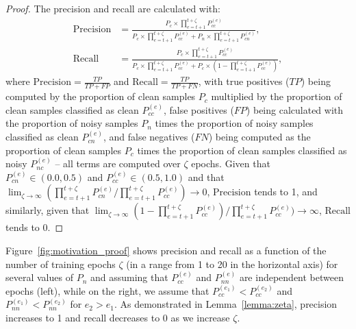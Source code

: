 \documentclass[review]{elsarticle}
\begin{document}
\begin{proof}

The precision and recall are calculated with:
\begin{equation}
\begin{split}
    \text{Precision}&=\frac{P_c \times  \prod_{e=t+1}^{t+\zeta} P^{(e)}_{cc}}{ P_c \times \prod_{e=t+1}^{t+\zeta} P^{(e)}_{cc} +  P_n \times \prod_{e=t+1}^{t+\zeta} P^{(e)}_{cn}}, \\
    \text{Recall}&=\frac{ P_c \times \prod_{e=t+1}^{t+\zeta} P^{(e)}_{cc}}{ P_c \times \prod_{e=t+1}^{t+\zeta} P^{(e)}_{cc} + P_c \times  (1-\prod_{e=t+1}^{t+\zeta}P^{(e)}_{cc})},
\end{split}
\label{eq:precision_recall}
\end{equation}
where $\text{Precision} = \frac{TP}{TP+FP}$ and $\text{Recall}=\frac{TP}{TP+FN}$, with true positives ($TP$) being computed by the proportion of clean samples $P_c$ multiplied by the proportion of clean samples classified as clean $P_{cc}^{(e)}$, false positives ($FP$) being calculated with the proportion of noisy samples $P_n$ times the proportion of noisy samples classified as clean $P_{cn}^{(e)}$, and false negatives ($FN$) being computed as the proportion of clean samples $P_c$ times the proportion of clean samples classified as noisy $P_{nc}^{(e)}$ -- all terms are computed over $\zeta$ epochs.
Given that $P^{(e)}_{cn} \in (0.0,0.5)$ and $P^{(e)}_{cc} \in (0.5,1.0)$ and that
\noindent$\lim_{\zeta \rightarrow \infty} (\prod_{e=t+1}^{t+\zeta} P^{(e)}_{cn}/\prod_{e=t+1}^{t+\zeta} P^{(e)}_{cc})\rightarrow 0$,  $\text{Precision}$ tends to 1, and similarly, given that $\lim_{\zeta \rightarrow \infty} (1-\prod_{e=t+1}^{t+\zeta}P^{(e)}_{cc})/\prod_{e=t+1}^{t+\zeta} P^{(e)}_{cc})\rightarrow \infty$,  $\text{Recall}$ tends to 0.

\end{proof}

Figure~\ref{fig:motivation_proof} shows precision and recall 
as a function of the number of training epochs $\zeta$ (in a range from 1 to 20 in the horizontal axis)
for several values of $P_n$ and assuming that $P^{(e)}_{cc}$ and $P^{(e)}_{nn}$ are independent between epochs (left), while on the right, we assume that $P^{(e_1)}_{cc} < P^{(e_2)}_{cc}$ and $P^{(e_1)}_{nn} < P^{(e_2)}_{nn}$ for $e_2 > e_1$. 
As demonstrated in Lemma~\ref{lemma:zeta}, precision increases to 1 and recall decreases to 0 as we increase $\zeta$.
\end{document}
